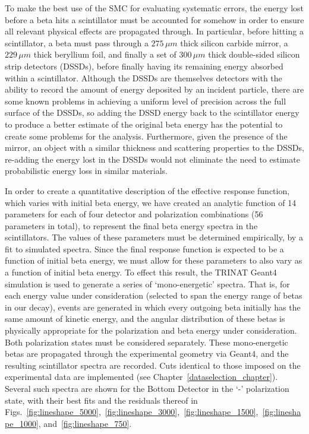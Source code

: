 To make the best use of the SMC for evaluating systematic errors, the energy lost before a beta hits a scintillator must be accounted for somehow in order to ensure all relevant physical effects are propagated through.  In particular, before hitting a scintillator, a beta must pass through a $275\,\mu m$ thick silicon carbide mirror, a $229\,\mu m$ thick beryllium foil, %
and finally a set of $300\,\mu m$ thick double-sided silicon strip detectors (DSSDs), before finally having its remaining energy absorbed within a scintillator.  Although the DSSDs are themselves detectors with the ability to record the amount of energy deposited by an incident particle, there are some known problems in achieving a uniform level of precision across the full surface of the DSSDs, so adding the DSSD energy back to the scintillator energy to produce a better estimate of the original beta energy has the potential to create some problems for the analysis.  Furthermore, given the presence of the mirror, an object with a similar thickness and scattering properties to the DSSDs, re-adding the energy lost in the DSSDs would not eliminate the need to estimate probabilistic energy loss in similar materials.  

In order to create a quantitative description of the effective response function, which varies with initial beta energy, we have created an analytic function of 14 parameters for each of four detector and polarization combinations (56 parameters in total), to represent the final beta energy spectra in the scintillators.  The values of these parameters must be determined empirically, by a fit to simulated spectra.  Since the final response function is expected to be a function of initial beta energy, we must allow for these parameters to also vary as a function of initial beta energy.  To effect this result, the TRINAT Geant4 simulation is used to generate a series of `mono-energetic' spectra.  That is, for each energy value under consideration (selected to span the energy range of betas in our decay), events are generated in which every outgoing beta initially has the same amount of kinetic energy, and the angular distribution of these betas is physically appropriate for the polarization and beta energy under consideration.  Both polarization states must be considered separately.  These mono-energetic betas are propagated through the experimental geometry via Geant4, and the resulting scintillator spectra are recorded.  Cuts identical to those imposed on the experimental data are implemented (see Chapter~\ref{dataselection_chapter}).    Several such spectra are shown for the Bottom Detector in the `-' polarization state, with their best fits and the residuals thereof in Figs.~\ref{fig:lineshape_5000},~\ref{fig:lineshape_3000},~\ref{fig:lineshape_1500},~\ref{fig:lineshape_1000}, and~\ref{fig:lineshape_750}.

